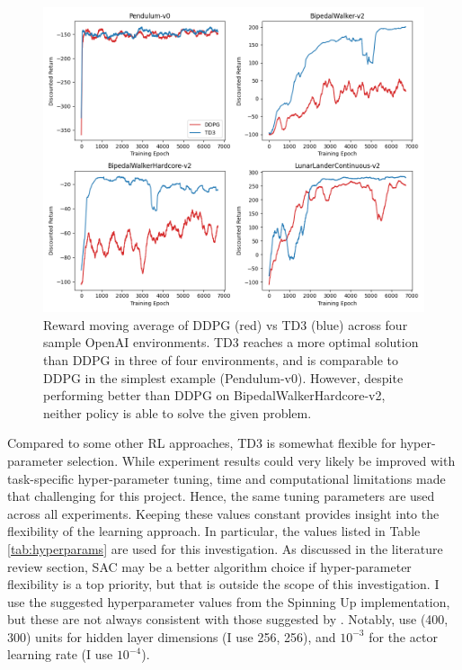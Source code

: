 \documentclass{article}
\begin{document}
\begin{figure}[!th]
\centering
  \includegraphics[scale=0.5]{figures/td3_vs_ddpg}
  \caption{Reward moving average of DDPG (red) vs TD3 (blue) across four sample OpenAI environments. TD3 reaches a more optimal solution than DDPG in three of four environments, and is comparable to DDPG in the simplest example (Pendulum-v0). However, despite performing better than DDPG on BipedalWalkerHardcore-v2, neither policy is able to solve the given problem.}
  \label{fig:td3_vs_ddpg}
\end{figure}
Compared to some other RL approaches, TD3 is somewhat flexible for hyper-parameter selection. While experiment results could very likely be improved with task-specific hyper-parameter tuning, time and computational limitations made that challenging for this project. Hence, the same tuning parameters are used across all experiments. Keeping these values constant provides insight into the flexibility of the learning approach. In particular, the values listed in Table \ref{tab:hyperparams} are used for this investigation. As discussed in the literature review section, SAC may be a better algorithm choice if hyper-parameter flexibility is a top priority, but that is outside the scope of this investigation. I use the suggested hyperparameter values from the Spinning Up implementation, but these are not always consistent with those suggested by \cite{td3}. Notably, \cite{td3} use (400, 300) units for hidden layer dimensions (I use 256, 256), and $10^{-3}$ for the actor learning rate (I use $10^{-4}$).
\end{document}
